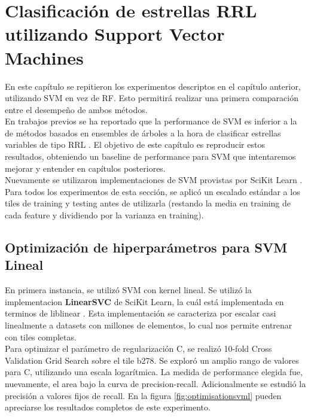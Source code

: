 \chapter{Clasificación de estrellas RRL utilizando Support Vector Machines}

En este capítulo se repitieron los experimentos descriptos en el capítulo anterior, utilizando SVM en vez de RF. Esto permitirá realizar una primera comparación entre el desempeño de ambos métodos. \\

En trabajos previos se ha reportado que la performance de SVM es inferior a la de métodos basados en ensembles de árboles a la hora de clasificar estrellas variables de tipo RRL \cite{jbc} \cite{elorrieta}. El objetivo de este capítulo es reproducir estos resultados, obteniendo un baseline de performance para SVM que intentaremos mejorar y entender en capítulos posteriores. \\

Nuevamente se utilizaron implementaciones de SVM provistas por SciKit Learn\cite{sklearn_api} \cite{pedregosa2011scikit}. Para todos los experimentos de esta sección, se aplicó un escalado estándar a los tiles de training y testing antes de utilizarla (restando la media en training de cada feature y dividiendo por la varianza en training).

\section{Optimización de hiperparámetros para SVM Lineal}

En primera instancia, se utilizó SVM con kernel lineal. Se utilizó la implementacion \textbf{LinearSVC} de SciKit Learn, la cuál está implementada en terminos de liblinear \cite{liblinear}. Esta implementación se caracteriza por escalar casi linealmente a datasets con millones de elementos, lo cual nos permite entrenar con tiles completas. \\

Para optimizar el parámetro de regularización C, se realizó 10-fold Cross Validation Grid Search sobre el tile b278. Se exploró un amplio rango de valores para C, utilizando una escala logarítmica. La medida de performance elegida fue, nuevamente, el area bajo la curva de precision-recall. Adicionalmente se estudió la precisión a valores fijos de recall. En la figura \ref{fig:optimisationsvml} pueden apreciarse los resultados completos de este experimento. \\ 

